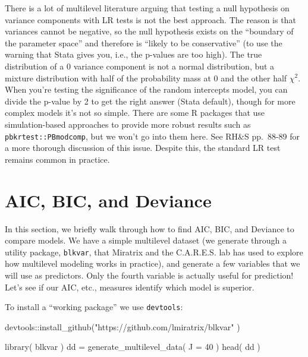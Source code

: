 \documentclass[
  letterpaper,
  DIV=11,
  numbers=noendperiod]{scrreprt}
\newenvironment{Shaded}{\begin{snugshade}}{\end{snugshade}}
\newcommand{\AttributeTok}[1]{\textcolor[rgb]{0.49,0.56,0.16}{#1}}
\newcommand{\DecValTok}[1]{\textcolor[rgb]{0.25,0.63,0.44}{#1}}
\newcommand{\FunctionTok}[1]{\textcolor[rgb]{0.02,0.16,0.49}{#1}}
\newcommand{\NormalTok}[1]{\textcolor[rgb]{0.00,0.44,0.13}{#1}}
\newcommand{\OtherTok}[1]{\textcolor[rgb]{0.00,0.44,0.13}{#1}}
\newcommand{\SpecialCharTok}[1]{\textcolor[rgb]{0.25,0.44,0.63}{#1}}
\newcommand{\StringTok}[1]{\textcolor[rgb]{0.25,0.44,0.63}{#1}}
\begin{document}
There is a lot of multilevel literature arguing that testing a null
hypothesis on variance components with LR tests is not the best
approach. The reason is that variances cannot be negative, so the null
hypothesis exists on the ``boundary of the parameter space'' and
therefore is ``likely to be conservative'' (to use the warning that
Stata gives you, i.e., the p-values are too high). The true distribution
of a 0 variance component is not a normal distribution, but a mixture
distribution with half of the probability mass at 0 and the other half
\(\chi^2\). When you're testing the significance of the random
intercepts model, you can divide the p-value by 2 to get the right
answer (Stata default), though for more complex models it's not so
simple. There are some R packages that use simulation-based approaches
to provide more robust results such as \texttt{pbkrtest::PBmodcomp}, but
we won't go into them here. See RH\&S pp.~88-89 for a more thorough
discussion of this issue. Despite this, the standard LR test remains
common in practice.

\hypertarget{aic-bic-and-deviance}{%
\chapter{AIC, BIC, and Deviance}\label{aic-bic-and-deviance}}

In this section, we briefly walk through how to find AIC, BIC, and
Deviance to compare models. We have a simple multilevel dataset (we
generate through a utility package, \texttt{blkvar}, that Miratrix and
the C.A.R.E.S. lab has used to explore how multilevel modeling works in
practice), and generate a few variables that we will use as predictors.
Only the fourth variable is actually useful for prediction! Let's see if
our AIC, etc., measures identify which model is superior.

To install a ``working package'' we use \texttt{devtools}:

\begin{Shaded}
\begin{Highlighting}[]
\NormalTok{devtools}\SpecialCharTok{::}\FunctionTok{install\_github}\NormalTok{(}\StringTok{"https://github.com/lmiratrix/blkvar"}\NormalTok{ )}
\end{Highlighting}
\end{Shaded}

\begin{Shaded}
\begin{Highlighting}[]
\FunctionTok{library}\NormalTok{( blkvar )}
\NormalTok{dd }\OtherTok{=} \FunctionTok{generate\_multilevel\_data}\NormalTok{( }\AttributeTok{J =} \DecValTok{40}\NormalTok{ )}
\FunctionTok{head}\NormalTok{( dd )}
\end{Highlighting}
\end{Shaded}
\end{document}

